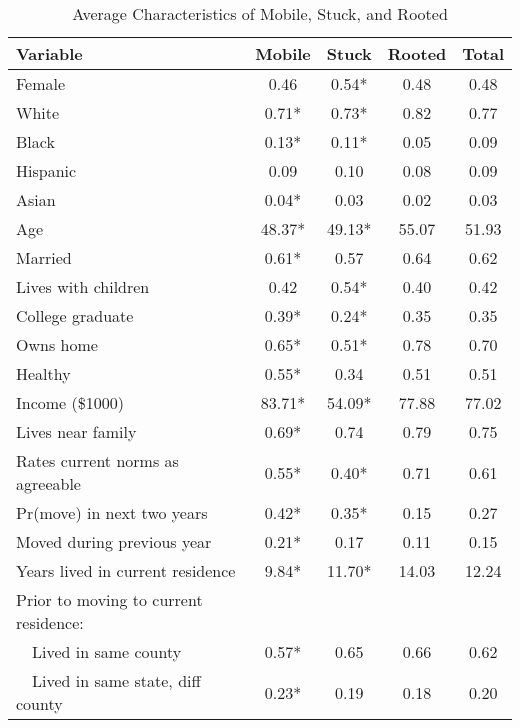 \begin{table}[ht]
\caption{Average Characteristics of Mobile, Stuck, and Rooted}
\label{tab:descT2}
\centering
\begin{threeparttable}
\begin{tabular}{lcccc}
\toprule 
Variable & Mobile & Stuck & Rooted & Total \\
\midrule 
Female                                    & 0.46 & 0.54* & 0.48 & 0.48 \\ 
White                                     & 0.71* & 0.73* & 0.82 & 0.77 \\ 
Black                                     & 0.13* & 0.11* & 0.05 & 0.09 \\ 
Hispanic                                  & 0.09 & 0.10 & 0.08 & 0.09 \\ 
Asian                                     & 0.04* & 0.03 & 0.02 & 0.03 \\ 
Age                                       & 48.37* & 49.13* & 55.07 & 51.93 \\ 
Married                                   & 0.61* & 0.57 & 0.64 & 0.62 \\ 
Lives with children                       & 0.42 & 0.54* & 0.40 & 0.42 \\ 
College graduate                          & 0.39* & 0.24* & 0.35 & 0.35 \\ 
Owns home                                 & 0.65* & 0.51* & 0.78 & 0.70 \\ 
Healthy                                   & 0.55* & 0.34 & 0.51 & 0.51 \\ 
Income (\$1000)                          & 83.71* & 54.09* & 77.88 & 77.02 \\ 
Lives near family                         & 0.69* & 0.74 & 0.79 & 0.75 \\ 
Rates current norms as agreeable          & 0.55* & 0.40* & 0.71 & 0.61 \\ 
Pr(move) in next two years                & 0.42* & 0.35* & 0.15 & 0.27 \\ 
Moved during previous year                & 0.21* & 0.17 & 0.11 & 0.15 \\ 
Years lived in current residence          & 9.84* & 11.70* & 14.03 & 12.24 \\ 
Prior to moving to current residence: \\ 
~~Lived in same county                    & 0.57* & 0.65 & 0.66 & 0.62 \\ 
~~Lived in same state, diff county        & 0.23* & 0.19 & 0.18 & 0.20 \\ 

\end{tabular}
\end{threeparttable}
\end{table}
